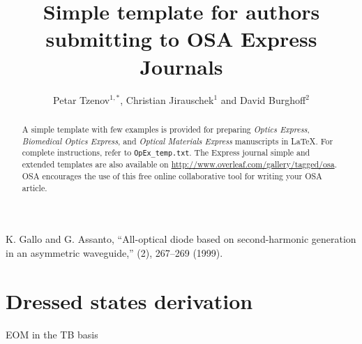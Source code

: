 \documentclass[10pt,letterpaper]{article}
\begin{document}
	
	\title{Simple template for authors submitting to OSA Express Journals}
	
	\author{Petar Tzenov$^{1,*}$, Christian Jirauschek$^1$ and David Burghoff$^{2}$}
	
\address{$^1$ Institute for Nanoelectronics, Technische Universit\''at M\''unchen, D-80333 Munich, Germany}
	\address{$^2$ Somewhere in MIT, US}
	
	
	
	
	\begin{abstract}
		A simple template with few examples is provided for preparing \textit{Optics Express}, \textit{Biomedical Optics Express}, and \textit{Optical Materials Express} manuscripts in \LaTeX. For complete instructions, refer to \texttt{OpEx\_temp.txt}. The Express journal simple and extended templates are also available on \url{http://www.overleaf.com/gallery/tagged/osa}. OSA encourages the use of this free online collaborative tool for writing your OSA article.
	\end{abstract}
	
	
	\begin{thebibliography}{99}
		
		 K. Gallo and G. Assanto, ``All-optical diode based on second-harmonic generation in an asymmetric waveguide,'' (2), 267--269 (1999).
	\end{thebibliography}
	
	\section{Dressed states derivation}
	
	EOM in the TB basis
	
\end{document}
